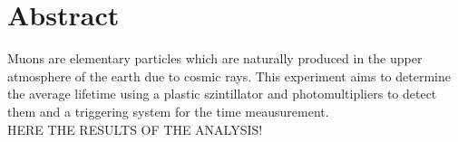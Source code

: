 \thispagestyle{plain}
\section*{Abstract}
Muons are elementary particles which are naturally produced in the upper atmosphere of the earth due 
to cosmic rays. This experiment aims to determine the average lifetime using a plastic szintillator and
photomultipliers to detect them and a triggering system for the time meausurement.\\
HERE THE RESULTS OF THE ANALYSIS!